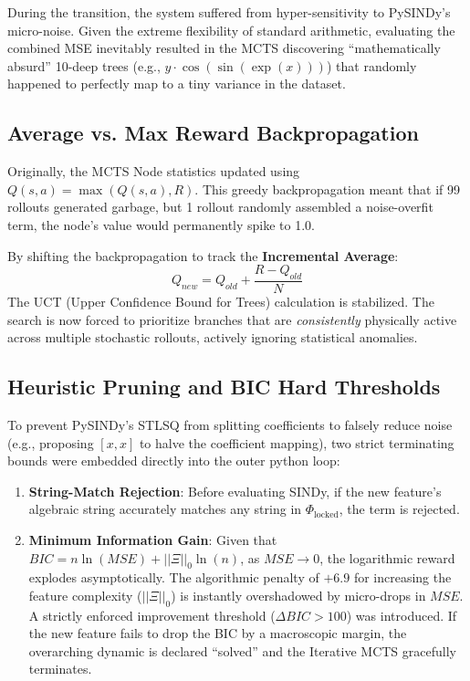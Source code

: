 \documentclass[11pt, a4paper]{article}
\begin{document}
During the transition, the system suffered from hyper-sensitivity to PySINDy's micro-noise. Given the extreme flexibility of standard arithmetic, evaluating the combined MSE inevitably resulted in the MCTS discovering ``mathematically absurd'' 10-deep trees (e.g., $y \cdot \cos(\sin(\exp(x)))$) that randomly happened to perfectly map to a tiny variance in the dataset.

\subsection{Average vs. Max Reward Backpropagation}
Originally, the MCTS Node statistics updated using $Q(s,a) = \max(Q(s, a), R)$. This greedy backpropagation meant that if 99 rollouts generated garbage, but 1 rollout randomly assembled a noise-overfit term, the node’s value would permanently spike to 1.0.

By shifting the backpropagation to track the \textbf{Incremental Average}:
\begin{equation}
Q_{new} = Q_{old} + \frac{R - Q_{old}}{N}
\end{equation}
The UCT (Upper Confidence Bound for Trees) calculation is stabilized. The search is now forced to prioritize branches that are \textit{consistently} physically active across multiple stochastic rollouts, actively ignoring statistical anomalies.

\subsection{Heuristic Pruning and BIC Hard Thresholds}
To prevent PySINDy's STLSQ from splitting coefficients to falsely reduce noise (e.g., proposing $[x, x]$ to halve the coefficient mapping), two strict terminating bounds were embedded directly into the outer python loop:
\begin{enumerate}
    \item \textbf{String-Match Rejection}: Before evaluating SINDy, if the new feature's algebraic string accurately matches any string in $\Phi_{\text{locked}}$, the term is rejected.
    \item \textbf{Minimum Information Gain}: Given that $BIC = n \ln(MSE) + ||\Xi||_0 \ln(n)$, as $MSE \to 0$, the logarithmic reward explodes asymptotically. The algorithmic penalty of $+6.9$ for increasing the feature complexity ($||\Xi||_0$) is instantly overshadowed by micro-drops in $MSE$. A strictly enforced improvement threshold ($\Delta BIC > 100$) was introduced. If the new feature fails to drop the BIC by a macroscopic margin, the overarching dynamic is declared ``solved'' and the Iterative MCTS gracefully terminates.
\end{enumerate}
\end{document}
